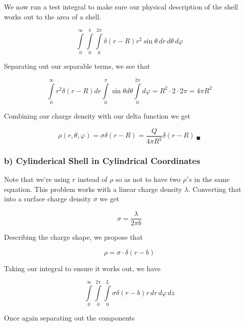 We now run a test integral to make sure our physical description of
the shell works out to the area of a shell.

\begin{equation}
  \int\limits_0^\infty \int\limits_0^\pi \int\limits_0^{2\pi}
  \delta(r-R) r^2\sin{\theta}\, dr\, d\theta\, d\varphi
\end{equation}

Separating out our separable terms, we see that

\begin{equation}
  \int\limits_0^\infty r^2\delta(r-R) dr
  \int\limits_0^\pi \sin{\theta} d\theta
  \int\limits_0^{2\pi} d\varphi
  = R^2 \cdot 2 \cdot 2\pi
  = 4\pi{}R^2
\end{equation}

Combining our charge density with our delta function we get

\begin{equation}
  \rho(r, \theta, \varphi) = \sigma\delta(r-R) = \frac{Q}{4\pi{}R^2}\delta(r-R)
  \ _\blacksquare
\end{equation}

\subsubsection*{b) Cylinderical Shell in Cylindrical Coordinates}

Note that we're using $r$ instead of $\rho$ so as not to have two
$\rho's$ in the same equation.  This problem works with a linear
charge density $\lambda$.  Converting that into a surface charge
density $\sigma$ we get

\begin{equation}
  \sigma = \frac{\lambda}{2 \pi{} b}
\end{equation}

Describing the charge shape, we propose that

\begin{equation}
  \rho = \sigma \cdot \delta(r - b)
\end{equation}

Taking our integral to ensure it works out, we have

\begin{equation}
  \int\limits_0^\infty
  \int\limits_0^{2\pi}
  \int\limits_0^L
  \sigma \delta(r-b)
  r
  \,dr
  \,d\varphi
  \,dz
\end{equation}

Once again separating out the components

